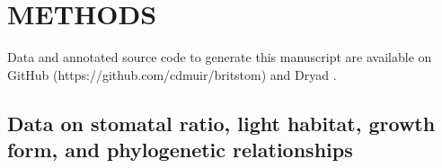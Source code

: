 \documentclass[12pt, oneside]{article}
\begin{document}


\section*{METHODS}

Data and annotated source code to generate this manuscript are available on GitHub (https://github.com/cdmuir/britstom) and Dryad \citep{Muir_dryad}.

\subsection*{Data on stomatal ratio, light habitat, growth form, and phylogenetic relationships}
\end{document}
